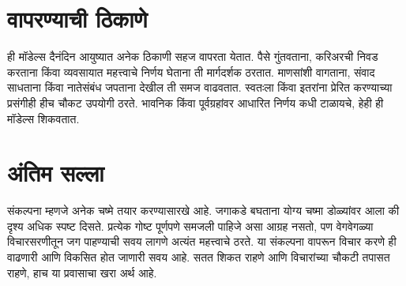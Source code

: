 \section*{वापरण्याची ठिकाणे}

ही मॉडेल्स दैनंदिन आयुष्यात अनेक ठिकाणी सहज वापरता येतात. पैसे गुंतवताना, करिअरची निवड करताना किंवा व्यवसायात महत्त्वाचे निर्णय घेताना ती मार्गदर्शक ठरतात. माणसांशी वागताना, संवाद साधताना किंवा नातेसंबंध जपताना देखील ती समज वाढवतात. स्वतःला किंवा इतरांना प्रेरित करण्याच्या प्रसंगीही हीच चौकट उपयोगी ठरते. भावनिक किंवा पूर्वग्रहांवर आधारित निर्णय कधी टाळायचे, हेही ही मॉडेल्स शिकवतात.

\section*{अंतिम सल्ला}
संकल्पना म्हणजे अनेक चष्मे तयार करण्यासारखे आहे. जगाकडे बघताना योग्य चष्मा डोळ्यांवर आला की दृश्य अधिक स्पष्ट दिसते. प्रत्येक गोष्ट पूर्णपणे समजली पाहिजे असा आग्रह नसतो, पण वेगवेगळ्या विचारसरणीतून जग पाहण्याची सवय लागणे अत्यंत महत्त्वाचे ठरते. या संकल्पना वापरून विचार करणे ही वाढणारी आणि विकसित होत जाणारी सवय आहे. सतत शिकत राहणे आणि विचारांच्या चौकटी तपासत राहणे, हाच या प्रवासाचा खरा अर्थ आहे.





